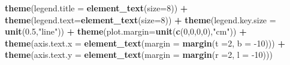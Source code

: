 \documentclass[12pt,twoside]{reedthesis}
\newenvironment{Shaded}{\begin{snugshade}}{\end{snugshade}}
\newcommand{\DataTypeTok}[1]{\textcolor[rgb]{0.13,0.29,0.53}{#1}}
\newcommand{\DecValTok}[1]{\textcolor[rgb]{0.00,0.00,0.81}{#1}}
\newcommand{\FloatTok}[1]{\textcolor[rgb]{0.00,0.00,0.81}{#1}}
\newcommand{\KeywordTok}[1]{\textcolor[rgb]{0.13,0.29,0.53}{\textbf{#1}}}
\newcommand{\NormalTok}[1]{#1}
\newcommand{\OperatorTok}[1]{\textcolor[rgb]{0.81,0.36,0.00}{\textbf{#1}}}
\newcommand{\StringTok}[1]{\textcolor[rgb]{0.31,0.60,0.02}{#1}}
\begin{document}
\begin{Shaded}
\begin{Highlighting}[]
\StringTok{  }\KeywordTok{theme}\NormalTok{(}\DataTypeTok{legend.title =} \KeywordTok{element_text}\NormalTok{(}\DataTypeTok{size=}\DecValTok{8}\NormalTok{)) }\OperatorTok{+}
\StringTok{  }\KeywordTok{theme}\NormalTok{(}\DataTypeTok{legend.text=}\KeywordTok{element_text}\NormalTok{(}\DataTypeTok{size=}\DecValTok{8}\NormalTok{)) }\OperatorTok{+}
\StringTok{  }\KeywordTok{theme}\NormalTok{(}\DataTypeTok{legend.key.size =} \KeywordTok{unit}\NormalTok{(}\FloatTok{0.5}\NormalTok{,}\StringTok{"line"}\NormalTok{)) }\OperatorTok{+}
\StringTok{  }\KeywordTok{theme}\NormalTok{(}\DataTypeTok{plot.margin=}\KeywordTok{unit}\NormalTok{(}\KeywordTok{c}\NormalTok{(}\DecValTok{0}\NormalTok{,}\DecValTok{0}\NormalTok{,}\DecValTok{0}\NormalTok{,}\DecValTok{0}\NormalTok{),}\StringTok{"cm"}\NormalTok{)) }\OperatorTok{+}
\StringTok{  }\KeywordTok{theme}\NormalTok{(}\DataTypeTok{axis.text.x =} \KeywordTok{element_text}\NormalTok{(}\DataTypeTok{margin =}  \KeywordTok{margin}\NormalTok{(}\DataTypeTok{t =}\DecValTok{2}\NormalTok{, }\DataTypeTok{b =} \DecValTok{-10}\NormalTok{))) }\OperatorTok{+}\StringTok{ }
\StringTok{  }\KeywordTok{theme}\NormalTok{(}\DataTypeTok{axis.text.y =} \KeywordTok{element_text}\NormalTok{(}\DataTypeTok{margin =}  \KeywordTok{margin}\NormalTok{(}\DataTypeTok{r =}\DecValTok{2}\NormalTok{, }\DataTypeTok{l =} \DecValTok{-10}\NormalTok{)))}
  

\end{Highlighting}
\end{Shaded}
\end{document}
